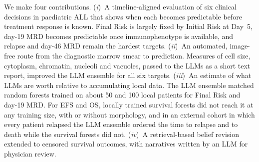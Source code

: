 \documentclass[pdflatex,sn-nature]{sn-jnl}
\begin{document}
We make four contributions.
(\textit{i})~A timeline-aligned evaluation of six clinical decisions in
paediatric ALL that shows when each becomes predictable before
treatment response is known.
Final Risk is largely fixed by Initial Risk at Day~5, day-19 MRD
becomes predictable once immunophenotype is available, and relapse and
day-46 MRD remain the hardest targets.
(\textit{ii})~An automated, image-free route from the diagnostic marrow
smear to prediction.
Measures of cell size, cytoplasm, chromatin, nucleoli and vacuoles,
passed to the LLMs as a short text report, improved the LLM ensemble
for all six targets.
(\textit{iii})~An estimate of what LLMs are worth relative to
accumulating local data.
The LLM ensemble matched random forests trained on about 50 and 100
local patients for Final Risk and day-19 MRD.
For EFS and OS, locally trained survival forests did not reach it at
any training size, with or without morphology, and in an external
cohort in which every patient relapsed the LLM ensemble ordered the
time to relapse and to death while the survival forests did not.
(\textit{iv})~A retrieval-based belief revision extended to censored
survival outcomes, with narratives written by an LLM for physician
review.
\end{document}
